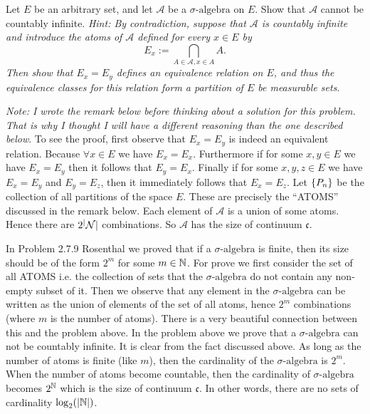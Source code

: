 \begin{problem}
	Let $ E $ be an arbitrary set, and let $ \mathcal{A} $ be a $\sigma\text{-algebra}$ on $ E $. Show that $ \mathcal{A} $ cannot be countably infinite. \emph{Hint: By contradiction, suppose that $ \mathcal{A} $ is countably infinite and introduce the atoms of $ \mathcal{A} $ defined for every $ x\in E $ by}
	\[ E_x := \bigcap_{A \in \mathcal{A}, x\in A} A. \]
	\emph{Then show that $ E_x = E_y $ defines an equivalence relation on $ E $, and thus the equivalence classes for this relation form a partition of $ E $ be measurable sets}.
\end{problem}
\begin{solution}
	\emph{Note: I wrote the remark below before thinking about a solution for this problem. That is why I thought I will have a different reasoning than the one described below}. To see the proof, first observe that $ E_x = E_y $ is indeed an equivalent relation. Because $ \forall x\in E $ we have $ E_x = E_x $. Furthermore if for some $ x,y \in E $ we have $ E_x = E_y $ then it follows that $ E_y = E_x $. Finally if for some $ x,y,z \in E $ we have $ E_x = E_y $ and $ E_y = E_z $, then it immediately follows that $ E_x = E_z $. Let $ \{P_n\} $ be the collection of all partitions of the space $ E $. These are precisely the ``ATOMS'' discussed in the remark below. Each element of $ \mathcal{A} $ is a union of some atoms. Hence there are $ 2^|\mathcal{N}| $ combinations. So $ \mathcal{A} $ has the size of continuum $ \mathfrak{c} $.
\end{solution}


\begin{remark}
	In Problem 2.7.9 Rosenthal we proved that if a $\sigma\text{-algebra}$ is finite, then its size should be of the form $ 2^m $ for some $ m\in \mathbb{N} $. For prove we first consider the set of all ATOMS i.e. the collection of sets that the $\sigma\text{-algebra}$ do not contain any non-empty subset of it. Then we observe that any element in the $\sigma\text{-algebra}$ can be written as the union of elements of the set of all atoms, hence $ 2^m $ combinations (where $ m $ is the number of atoms). There is a very beautiful connection between this and the problem above. In the problem above we prove that a $\sigma\text{-algebra}$ can not be countably infinite. It is clear from the fact discussed above. As long as the number of atoms is finite (like $ m $), then the cardinality of the $\sigma\text{-algebra}$ is $ 2^m $. When the number of atoms become countable, then the cardinality of $\sigma\text{-algebra}$ becomes $ 2^{\mathbb{N}} $ which is the size of continuum $ \mathfrak{c} $. In other words, there are no sets of cardinality $ \log_2(|\mathbb{N}|) $.
\end{remark}


